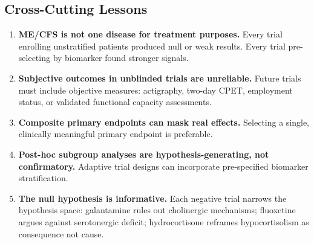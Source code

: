 \subsection{Cross-Cutting Lessons}
\label{subsec:neg-lessons}

\begin{enumerate}
    \item \textbf{ME/CFS is not one disease for treatment purposes.} Every trial enrolling unstratified patients produced null or weak results. Every trial pre-selecting by biomarker found stronger signals.

    \item \textbf{Subjective outcomes in unblinded trials are unreliable.} Future trials must include objective measures: actigraphy, two-day CPET, employment status, or validated functional capacity assessments.

    \item \textbf{Composite primary endpoints can mask real effects.} Selecting a single, clinically meaningful primary endpoint is preferable.

    \item \textbf{Post-hoc subgroup analyses are hypothesis-generating, not confirmatory.} Adaptive trial designs can incorporate pre-specified biomarker stratification.

    \item \textbf{The null hypothesis is informative.} Each negative trial narrows the hypothesis space: galantamine rules out cholinergic mechanisms; fluoxetine argues against serotonergic deficit; hydrocortisone reframes hypocortisolism as consequence not cause.
\end{enumerate}
